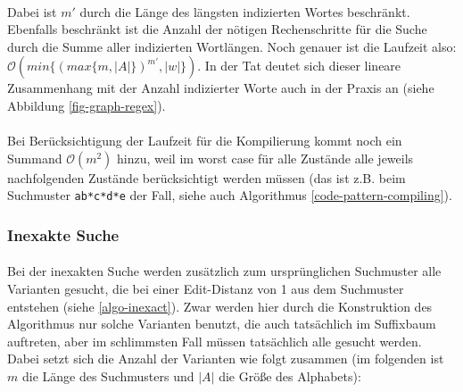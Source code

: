 \paragraph{} Dabei ist ${m'}$ durch die Länge des längsten indizierten Wortes beschränkt. Ebenfalls beschränkt ist die Anzahl der nötigen Rechenschritte für die Suche durch die Summe aller indizierten Wortlängen. Noch genauer ist die Laufzeit also: $\mathcal{O}(min \lbrace \left(max \lbrace m, |A| \rbrace \right)^{m'} , |w| \rbrace)$. In der Tat deutet sich dieser lineare Zusammenhang mit der Anzahl indizierter Worte auch in der Praxis an (siehe Abbildung \ref{fig-graph-regex}).


\paragraph{} Bei Berücksichtigung der Laufzeit für die Kompilierung kommt noch ein Summand $\mathcal{O}(m^2)$ hinzu, weil im worst case für alle Zustände alle jeweils nachfolgenden Zustände berücksichtigt werden müssen (das ist z.B. beim Suchmuster \texttt{ab*c*d*e} der Fall, siehe auch Algorithmus \ref{code-pattern-compiling}).

\subsubsection{Inexakte Suche}

\paragraph{} Bei der inexakten Suche werden zusätzlich zum ursprünglichen Suchmuster alle Varianten gesucht, die bei einer Edit-Distanz von 1 aus dem Suchmuster entstehen (siehe \ref{algo-inexact}). Zwar werden hier durch die Konstruktion des Algorithmus nur solche Varianten benutzt, die auch tatsächlich im Suffixbaum auftreten, aber im schlimmsten Fall müssen tatsächlich alle gesucht werden. Dabei setzt sich die Anzahl der Varianten wie folgt zusammen (im folgenden ist $m$ die Länge des Suchmusters und $|A|$ die Größe des Alphabets):

\paragraph{}

